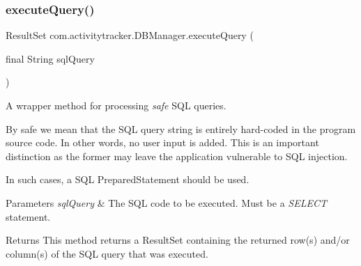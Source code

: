 \begin{DoxyCode}{0}

\end{DoxyCode}
\mbox{\label{classcom_1_1activitytracker_1_1_d_b_manager_adef71a18dc05536d80e83311841e1953}} 
\subsubsection{\texorpdfstring{executeQuery()}{executeQuery()}}
{\footnotesize\ttfamily Result\+Set com.\+activitytracker.\+D\+B\+Manager.\+execute\+Query (\begin{DoxyParamCaption}\item[{final String}]{sql\+Query }\end{DoxyParamCaption})\hspace{0.3cm}{\ttfamily [private]}}

A wrapper method for processing {\itshape safe} S\+QL queries.

By safe we mean that the S\+QL query string is entirely hard-\/coded in the program source code. In other words, no user input is added. This is an important distinction as the former may leave the application vulnerable to S\+QL injection.

In such cases, a S\+QL Prepared\+Statement should be used.


\begin{DoxyParams}{Parameters}
{\em sql\+Query} & The S\+QL code to be executed. Must be a {\itshape S\+E\+L\+E\+CT} statement.\\
\hline
\end{DoxyParams}
\begin{DoxyReturn}{Returns}
This method returns a Result\+Set containing the returned row(s) and/or column(s) of the S\+QL query that was executed. 
\end{DoxyReturn}


